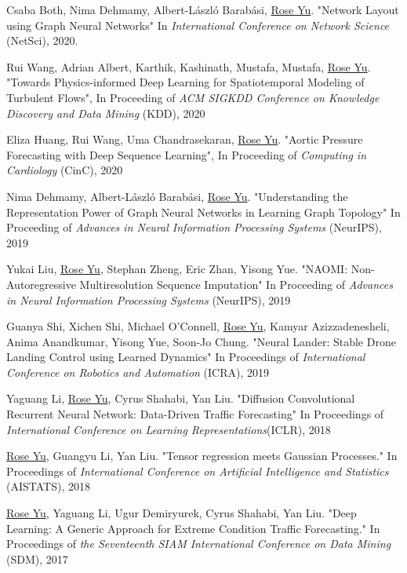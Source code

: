 \documentclass[margin,line]{res}
\begin{document}
\begin{resume}
\begin{enumerate}[label={[C\arabic*]}]
 \item Csaba Both, Nima Dehmamy,  Albert-László Barabási, \underline{Rose Yu}.
"Network Layout using Graph Neural Networks"
 In \textit{International Conference on Network Science} (NetSci),  2020.  

\item Rui Wang, Adrian Albert,  Karthik, Kashinath, Mustafa, Mustafa,  \underline{Rose Yu}. "Towards Physics-informed Deep Learning for Spatiotemporal Modeling of Turbulent Flows", In  Proceeding of\textit{ ACM SIGKDD Conference on Knowledge Discovery and Data Mining} (KDD), 2020

\item Eliza Huang, Rui Wang, Uma Chandrasekaran, \underline{Rose Yu}.  "Aortic Pressure Forecasting with Deep Sequence Learning", In  Proceeding of  \textit{Computing in Cardiology} (CinC), 2020 

\item Nima Dehmamy, Albert-L\'aszl\'o Barab\'asi, \underline{Rose Yu}.  "Understanding the Representation Power of Graph Neural Networks in Learning Graph Topology" In Proceeding of  \textit{Advances in Neural Information Processing Systems} (NeurIPS), 2019
 
 
\item  Yukai Liu, \underline{Rose Yu}, Stephan Zheng, Eric Zhan, Yisong Yue. "NAOMI: Non-Autoregressive Multiresolution Sequence Imputation" In  Proceeding of  \textit{Advances in Neural Information Processing Systems} (NeurIPS), 2019


\item Guanya Shi, Xichen Shi, Michael O'Connell, \underline{Rose Yu}, Kamyar Azizzadenesheli, Anima Anandkumar, Yisong Yue, Soon-Jo Chung. "Neural Lander: Stable Drone Landing Control using Learned Dynamics" In  Proceedings  of \textit{ International Conference on Robotics and Automation} (ICRA), 2019

\item 	Yaguang Li,  \underline{Rose Yu}, Cyrus Shahabi, Yan Liu. "Diffusion Convolutional Recurrent Neural Network: Data-Driven Traffic Forecasting" In  Proceedings  of   \textit{International Conference on Learning Representations}(ICLR), 2018 
	
\item  \underline{Rose Yu}, Guangyu Li, Yan Liu. "Tensor regression meets Gaussian Processes." In Proceedings  of   \textit{International Conference on Artificial Intelligence and Statistics} (AISTATS), 2018 

\item \underline{Rose Yu}, Yaguang Li, Ugur Demiryurek, Cyrus Shahabi, Yan Liu. "Deep Learning: A Generic Approach for Extreme Condition Traffic Forecasting." In   Proceedings  of  \textit{the Seventeenth SIAM International Conference on Data Mining }(SDM), 2017


\end{enumerate}
\end{resume}
\end{document}
